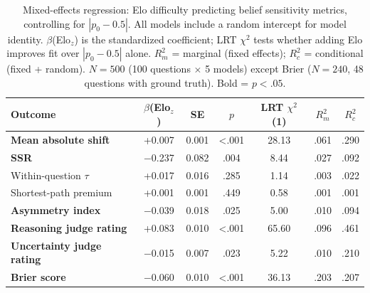 \begin{table}[t]
\centering
\small
\begin{tabular}{lcccccc}
\toprule
\textbf{Outcome} & \textbf{$\beta$(Elo$_z$)} & \textbf{SE} & \textbf{$p$} & \textbf{LRT $\chi^2$(1)} & \textbf{$R^2_m$} & \textbf{$R^2_c$} \\
\midrule
\textbf{Mean absolute shift} & +0.007 & 0.001 & <.001 & 28.13 & .061 & .290 \\
\textbf{SSR} & $-$0.237 & 0.082 & .004 & 8.44 & .027 & .092 \\
Within-question $\tau$ & +0.017 & 0.016 & .285 & 1.14 & .003 & .022 \\
Shortest-path premium & +0.001 & 0.001 & .449 & 0.58 & .001 & .001 \\
\textbf{Asymmetry index} & $-$0.039 & 0.018 & .025 & 5.00 & .010 & .094 \\
\textbf{Reasoning judge rating} & +0.083 & 0.010 & <.001 & 65.60 & .096 & .461 \\
\textbf{Uncertainty judge rating} & $-$0.015 & 0.007 & .023 & 5.22 & .010 & .210 \\
\textbf{Brier score} & $-$0.060 & 0.010 & <.001 & 36.13 & .203 & .207 \\
\bottomrule
\end{tabular}
\caption{Mixed-effects regression: Elo difficulty predicting belief sensitivity metrics, controlling for $|p_0 - 0.5|$. All models include a random intercept for model identity. $\beta$(Elo$_z$) is the standardized coefficient; LRT $\chi^2$ tests whether adding Elo improves fit over $|p_0 - 0.5|$ alone. $R^2_m$ = marginal (fixed effects); $R^2_c$ = conditional (fixed + random). $N = 500$ (100 questions $\times$ 5 models) except Brier ($N = 240$, 48 questions with ground truth). Bold = $p < .05$.}
\label{tab:elo_regression}
\end{table}